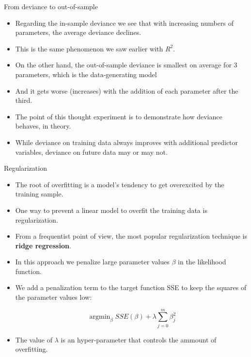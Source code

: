 \documentclass[handout]{beamer}
\begin{document}
\begin{frame}{From deviance to out-of-sample}
\scriptsize{

\begin{itemize}


\item Regarding the in-sample deviance we see that with increasing numbers of parameters, the average deviance declines. 
\item This is the same phenomenon we saw earlier with $R^2$.

\item On the other hand, the out-of-sample deviance is smallest on average for 3 parameters, which is the data-generating model
\item And it gets worse (increases) with the addition of each parameter after the third.

\item The point of this thought experiment is to demonstrate how deviance behaves, in theory. 
\item While deviance on training data always improves with additional predictor variables, deviance on future data may or may not.



\end{itemize}


} 
\end{frame}




\begin{frame}{Regularization}
\scriptsize{

\begin{itemize}

\item The root of overfitting is a model's tendency to get overexcited by the training sample.

\item One way to prevent a linear model to overfit the training data is regularization.

\item  From a frequentist point of view, the most popular regularization technique is \textbf{ridge regression}.


\item In this approach we penalize large parameter values $\beta$ in the likelihood function.

\item We add a penalization term to the target function SSE to keep  the squares of the parameter values low:

\begin{equation}
 \operatorname{argmin}_{\beta} SSE(\beta) + \lambda \sum_{j=0}^m\beta_j^2 
\end{equation} 

\item The value of $\lambda$ is an hyper-parameter that controls the ammount of overfitting.



\end{itemize}


} 
\end{frame}
\end{document}
